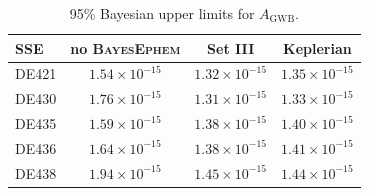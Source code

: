 \documentclass[iop,apj,twocolappendix]{emulateapj}
\begin{document}
\begin{table}[ht]
    \begin{center}
    \caption{95\% Bayesian upper limits for $A_\mathrm{GWB}$.\label{tab:upper}}
    \begin{tabular}{l|c|c|c}
SSE & no \textsc{BayesEphem} & Set III & Keplerian \\
\hline
DE421 & $1.54 \times 10^{-15}$ & $1.32 \times 10^{-15}$ & $1.35 \times 10^{-15}$ \\
DE430 & $1.76 \times 10^{-15}$ & $1.31 \times 10^{-15}$ & $1.33 \times 10^{-15}$ \\
DE435 & $1.59 \times 10^{-15}$ & $1.38 \times 10^{-15}$ & $1.40 \times 10^{-15}$ \\
DE436 & $1.64 \times 10^{-15}$ & $1.38 \times 10^{-15}$ & $1.41 \times 10^{-15}$ \\
DE438 & $1.94 \times 10^{-15}$ & $1.45 \times 10^{-15}$ & $1.44 \times 10^{-15}$ \\
    \end{tabular}
    \end{center}
\end{table}
%
\end{document}
